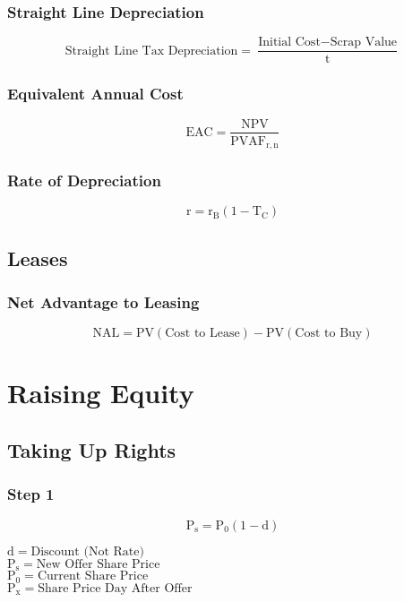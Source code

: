 \documentclass[11pt, english]{article}
\begin{document}
		\subsubsection{Straight Line Depreciation}

	$$\mathrm{\textrm{Straight Line Tax Depreciation}=\frac{\textrm{Initial Cost}-\textrm{Scrap Value}}{t}}$$

		\subsubsection{Equivalent Annual Cost}

	$$\mathrm{EAC=\frac{NPV}{PVAF_{r,n}}}$$

		\subsubsection{Rate of Depreciation}

	$$\mathrm{r=r_B(1-T_C)}$$

	\subsection{Leases}

		\subsubsection{Net Advantage to Leasing}

	$$\mathrm{NAL=PV(\textrm{Cost to Lease})-PV(\textrm{Cost to Buy})}$$

\newpage

\section{Raising Equity}

	\subsection{Taking Up Rights}

		\subsubsection{Step 1}

	$$\mathrm{P_s=P_0(1-d)}$$

	$\mathrm{d=\textrm{Discount (Not Rate)}}$\\
	$\mathrm{P_s=\textrm{New Offer Share Price}}$\\
	$\mathrm{P_0=\textrm{Current Share Price}}$\\
	$\mathrm{P_x=\textrm{Share Price Day After Offer}}$
\end{document}
